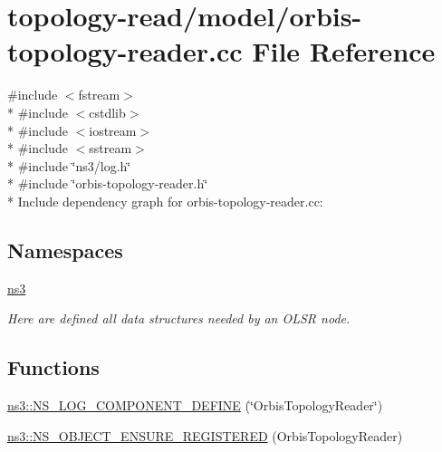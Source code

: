 \hypertarget{orbis-topology-reader_8cc}{}\section{topology-\/read/model/orbis-\/topology-\/reader.cc File Reference}
\label{orbis-topology-reader_8cc}
{\ttfamily \#include $<$fstream$>$}\\*
{\ttfamily \#include $<$cstdlib$>$}\\*
{\ttfamily \#include $<$iostream$>$}\\*
{\ttfamily \#include $<$sstream$>$}\\*
{\ttfamily \#include \char`\"{}ns3/log.\+h\char`\"{}}\\*
{\ttfamily \#include \char`\"{}orbis-\/topology-\/reader.\+h\char`\"{}}\\*
Include dependency graph for orbis-\/topology-\/reader.cc\+:
\subsection*{Namespaces}
\begin{DoxyCompactItemize}
\item 
 \hyperlink{namespacens3}{ns3}
\begin{DoxyCompactList}\small\item\em Here are defined all data structures needed by an O\+L\+SR node. \end{DoxyCompactList}\end{DoxyCompactItemize}
\subsection*{Functions}
\begin{DoxyCompactItemize}
\item 
\hyperlink{namespacens3_a687083ddff7b06e80e18dc426e4221dd}{ns3\+::\+N\+S\+\_\+\+L\+O\+G\+\_\+\+C\+O\+M\+P\+O\+N\+E\+N\+T\+\_\+\+D\+E\+F\+I\+NE} (\char`\"{}Orbis\+Topology\+Reader\char`\"{})
\item 
\hyperlink{namespacens3_a1da0f2c1e9e958bd342f6174ced8d561}{ns3\+::\+N\+S\+\_\+\+O\+B\+J\+E\+C\+T\+\_\+\+E\+N\+S\+U\+R\+E\+\_\+\+R\+E\+G\+I\+S\+T\+E\+R\+ED} (Orbis\+Topology\+Reader)
\end{DoxyCompactItemize}
